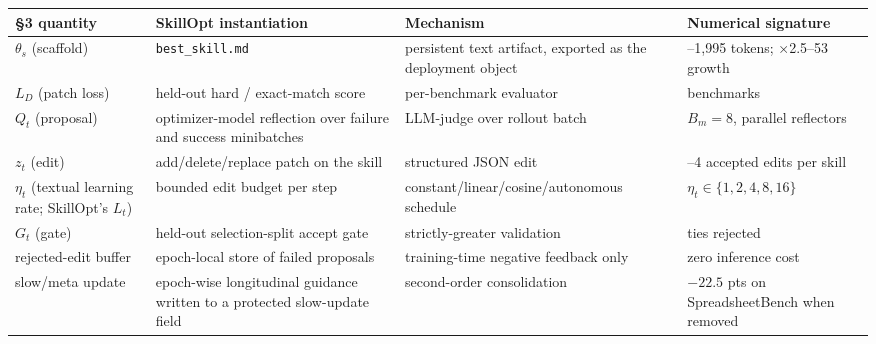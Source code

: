 \documentclass[
]{article}
\newcounter{none} %
\begin{document}
{\def\LTcaptype{none} %
\begin{longtable}[]{@{}
  >{\raggedright\arraybackslash}p{}
  >{\raggedright\arraybackslash}p{}
  >{\raggedright\arraybackslash}p{}
  >{\raggedright\arraybackslash}p{}@{}}
\toprule\noalign{}
\begin{minipage}[b]{\linewidth}\raggedright
§3 quantity
\end{minipage} & \begin{minipage}[b]{\linewidth}\raggedright
SkillOpt instantiation
\end{minipage} & \begin{minipage}[b]{\linewidth}\raggedright
Mechanism
\end{minipage} & \begin{minipage}[b]{\linewidth}\raggedright
Numerical signature
\end{minipage} \\
\midrule\noalign{}
\endhead
\bottomrule\noalign{}
\endlastfoot
\(\theta_s\) (scaffold) & \texttt{best\_skill.md} & persistent text
artifact, exported as the deployment object & 379--1,995 tokens;
×2.5--53 growth \\
\(L_D\) (patch loss) & held-out hard / exact-match score & per-benchmark
evaluator & 6 benchmarks \\
\(Q_t\) (proposal) & optimizer-model reflection over failure and success
minibatches & LLM-judge over rollout batch & \(B_m{=}8\), parallel
reflectors \\
\(z_t\) (edit) & add/delete/replace patch on the skill & structured JSON
edit & 1--4 accepted edits per skill \\
\(\eta_t\) (textual learning rate; SkillOpt's \(L_t\)) & bounded edit
budget per step & constant/linear/cosine/autonomous schedule &
\(\eta_t \in \{1,2,4,8,16\}\) \\
\(G_t\) (gate) & held-out selection-split accept gate & strictly-greater
validation & ties rejected \\
rejected-edit buffer & epoch-local store of failed proposals &
training-time negative feedback only & zero inference cost \\
slow/meta update & epoch-wise longitudinal guidance written to a
protected slow-update field & second-order consolidation & \(-22.5\) pts
on SpreadsheetBench when removed \\
\end{longtable}
}
\end{document}
